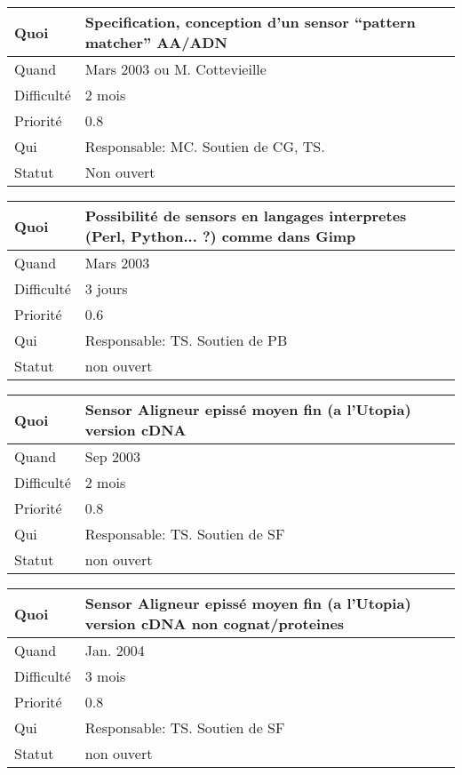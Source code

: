\documentclass[a4paper,11pt]{article}
\begin{document}
\begin{longtable}{|l|p{7cm}|}\hline
  Quoi & Specification, conception d'un sensor ``pattern matcher'' AA/ADN \\\hline
  Quand  &  Mars 2003 ou M. Cottevieille\\\hline
  Difficult\'e &  2 mois\\\hline
  Priorit\'e &  0.8 \\\hline
  Qui & Responsable: MC. Soutien de CG, TS.\\\hline
  Statut & Non ouvert\\\hline
\end{longtable}

\begin{longtable}{|l|p{7cm}|}\hline
  Quoi & Possibilit\'e de sensors en langages interpretes (Perl, Python... ?)
comme dans Gimp \\\hline
  Quand  &   Mars 2003 \\\hline
  Difficult\'e &  3 jours\\\hline
  Priorit\'e & 0.6 \\\hline
  Qui & Responsable: TS. Soutien de PB\\\hline
  Statut & non ouvert\\\hline
\end{longtable}

\begin{longtable}{|l|p{7cm}|}\hline
  Quoi & Sensor Aligneur episs{\'e} moyen fin (a l'Utopia) version cDNA\\\hline
  Quand  &  Sep 2003\\\hline
  Difficult\'e &  2 mois\\\hline
  Priorit\'e &  0.8\\\hline
  Qui & Responsable: TS. Soutien de SF\\\hline
  Statut & non ouvert\\\hline
\end{longtable}

\begin{longtable}{|l|p{7cm}|}\hline
  Quoi & Sensor Aligneur episs{\'e} moyen fin (a l'Utopia) version cDNA non
cognat/proteines \\\hline
  Quand  &  Jan. 2004\\\hline
  Difficult\'e &  3 mois\\\hline
  Priorit\'e &  0.8\\\hline
  Qui & Responsable: TS. Soutien de SF\\\hline
  Statut & non ouvert\\\hline
\end{longtable}
\end{document}
